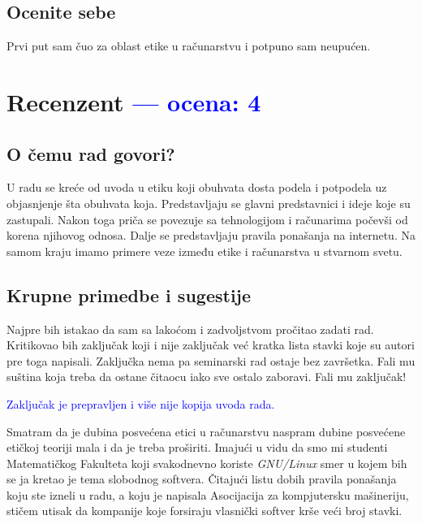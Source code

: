 \documentclass[a4paper]{report}
\newcommand{\odgovor}[1]{\textcolor{blue}{#1}}
\begin{document}
\section{Ocenite sebe}
Prvi put sam čuo za oblast etike u računarstvu i potpuno sam neupućen.


\chapter{Recenzent \odgovor{--- ocena: 4} }


\section{O čemu rad govori?}
U radu se kreće od uvoda u etiku koji obuhvata dosta podela i potpodela uz objasnjenje šta obuhvata koja. Predstavljaju
se glavni predstavnici i ideje koje su zastupali. Nakon toga priča se povezuje sa tehnologijom i računarima počevši od
korena njihovog odnosa. Dalje se predstavljaju pravila ponašanja na internetu. Na samom kraju imamo primere veze
između etike i računarstva u stvarnom svetu.

\section{Krupne primedbe i sugestije}
Najpre bih istakao da sam sa lakoćom i zadvoljstvom pročitao zadati rad. Kritikovao bih zaključak koji i nije zaključak već 
kratka lista stavki koje su autori pre toga napisali. Zaključka nema pa seminarski rad ostaje bez završetka. Fali mu suština 
koja treba da ostane čitaocu iako sve ostalo zaboravi. Fali mu zaključak! \par

\odgovor{Zaključak je prepravljen i više nije kopija uvoda rada.}

Smatram da je dubina posvećena etici u računarstvu naspram dubine posvećene etičkoj teoriji mala i da je treba proširiti. 
Imajući u vidu da smo mi studenti Matematičkog Fakulteta koji svakodnevno koriste \textit{GNU/Linux} smer u kojem bih se ja kretao je tema 
slobodnog softvera. Čitajući listu dobih pravila ponašanja koju ste izneli u radu, a koju je napisala Asocijacija za kompjutersku 
mašineriju, stičem utisak da kompanije koje forsiraju vlasnički softver krše veći broj stavki. \par
\end{document}
